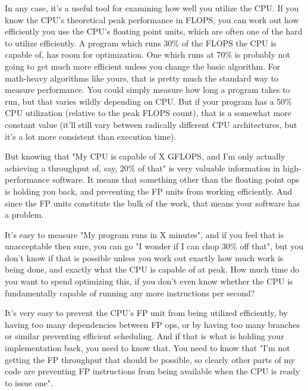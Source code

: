 \documentclass[11pt]{book} %
\begin{document}
In any case, it's a useful tool for examining how well you utilize the CPU. If you know the CPU's theoretical peak performance in FLOPS, you can work out how efficiently you use the CPU's floating point units, which are often one of the hard to utilize efficiently. A program which runs 30\% of the FLOPS the CPU is capable of, has room for optimization. One which runs at 70\% is probably not going to get much more efficient unless you change the basic algorithm. For math-heavy algorithms like yours, that is pretty much the standard way to measure performance. You could simply measure how long a program takes to run, but that varies wildly depending on CPU. But if your program has a 50\% CPU utilization (relative to the peak FLOPS count), that is a somewhat more constant value (it'll still vary between radically different CPU architectures, but it's a lot more consistent than execution time).

But knowing that "My CPU is capable of X GFLOPS, and I'm only actually achieving a throughput of, say, 20\% of that" is very valuable information in high-performance software. It means that something other than the floating point ops is holding you back, and preventing the FP units from working efficiently. And since the FP units constitute the bulk of the work, that means your software has a problem.

It's easy to measure "My program runs in X minutes", and if you feel that is unacceptable then sure, you can go "I wonder if I can chop 30\% off that", but you don't know if that is possible unless you work out exactly how much work is being done, and exactly what the CPU is capable of at peak. How much time do you want to spend optimizing this, if you don't even know whether the CPU is fundamentally capable of running any more instructions per second?

It's very easy to prevent the CPU's FP unit from being utilized efficiently, by having too many dependencies between FP ops, or by having too many branches or similar preventing efficient scheduling. And if that is what is holding your implementation back, you need to know that. You need to know that "I'm not getting the FP throughput that should be possible, so clearly other parts of my code are preventing FP instructions from being available when the CPU is ready to issue one".
\end{document}
